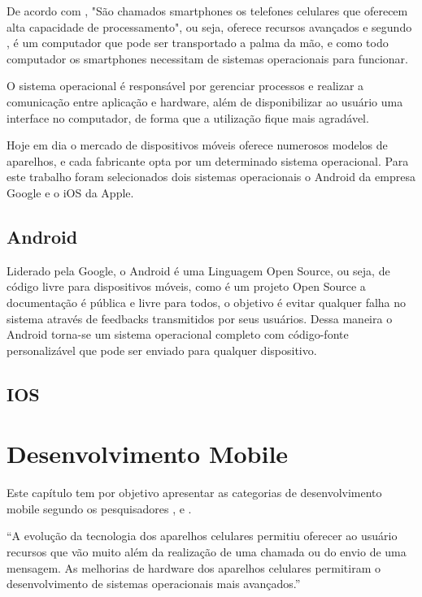 	De acordo com , "São chamados smartphones os telefones celulares que oferecem alta capacidade de processamento", ou seja, oferece recursos avançados e segundo , é um computador que pode ser transportado a palma da mão, e como todo computador os smartphones necessitam de sistemas operacionais para funcionar.
		
	O sistema operacional é responsável por gerenciar processos e realizar a comunicação entre aplicação e hardware, além de disponibilizar ao usuário uma interface no computador, de forma que a utilização fique mais agradável. \cite {velloso2014informatica}
			
	Hoje em dia o mercado de dispositivos móveis oferece numerosos modelos de aparelhos, e cada fabricante opta por um determinado sistema operacional. Para este trabalho foram selecionados dois sistemas operacionais o Android da empresa Google e o iOS da Apple. 
		
	\subsection{Android}
			
		Liderado pela Google, o Android é uma Linguagem Open Source, ou seja, de código livre para dispositivos móveis, como é um projeto Open Source a documentação é pública e livre para todos, o objetivo é evitar qualquer falha no sistema através de feedbacks transmitidos por seus usuários. Dessa maneira o Android torna-se um sistema operacional completo com código-fonte personalizável que pode ser enviado para qualquer dispositivo.
				
				
	\subsection{IOS}
			
				
			
\section{Desenvolvimento Mobile}

	Este capítulo tem por objetivo apresentar as categorias de desenvolvimento mobile segundo os pesquisadores ,  e .

	\begin{citacao}
		“A evolução da tecnologia dos aparelhos celulares permitiu oferecer ao usuário recursos que vão muito além da realização de uma chamada ou do envio de uma mensagem. As melhorias de hardware dos aparelhos celulares permitiram o desenvolvimento de sistemas operacionais mais avançados.”\cite[]{da2014paradigmas}
	\end{citacao}
	
